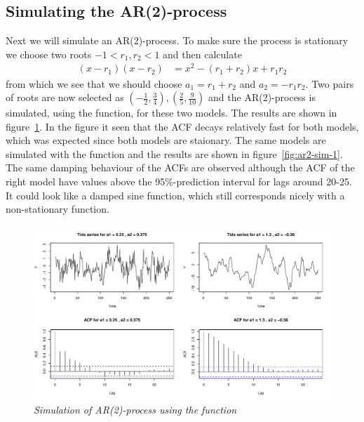 \subsection*{Simulating the AR(2)-process}
Next we will simulate an AR(2)-process. To make sure the process is stationary we choose two roots $-1<r_1, r_2<1$ and then calculate
\begin{align*}
    (x-r_1)(x-r_2) &= x^2 - (r_1+r_2)x + r_1r_2
\end{align*}
from which we see that we should choose $a_1=r_1+r_2$ and $a_2=-r_1r_2$. Two pairs of roots are now selected as $(-\frac{1}{2}, \frac{3}{4}), (\frac{2}{5}, \frac{9}{10})$ and the AR(2)-process is simulated, using the  function, for these two models. The results are shown in figure~\ref{fig:ar2-filter-1}. In the figure it seen that the ACF decays relatively fast for both models, which was expected since both models are staionary. The same models are simulated with the  function and the results are shown in figure~\ref{fig:ar2-sim-1}. The same damping behaviour of the ACFs are observed although the ACF of the right model have values above the 95\%-prediction interval for lags around 20-25. It could look like a damped sine function, which still corresponds nicely with a non-stationary function. 

\begin{figure}
    \centering
    \includegraphics[width=140mm]{ar2-filter-1.pdf}
    \caption{\textit{Simulation of AR(2)-process using the  function}}
    \label{fig:ar2-filter-1}
\end{figure}

